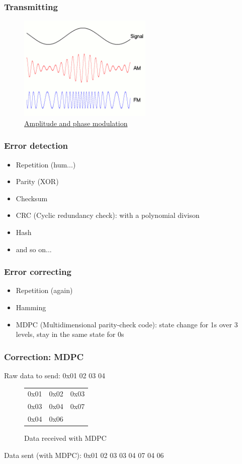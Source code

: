   \begin{frame}
    \frametitle{Transmitting}
    \begin{figure}[t]
      \centering
      \includegraphics[height=5cm]{./imgs/modulation.png}
      \caption{\color{blue}\href{https://upload.wikimedia.org/wikipedia/commons/a/a4/Amfm3-en-de.gif}{Amplitude and phase modulation}}
      \label{fig:modulation}
    \end{figure}
  \end{frame}
  \begin{frame}
    \frametitle{Error detection}
      \begin{itemize}
        \item Repetition (hum...) \pause
        \item Parity (XOR) \pause
        \item Checksum \pause
        \item CRC (Cyclic redundancy check): with a polynomial divison \pause
        \item Hash \pause
        \item and so on...
      \end{itemize}
  \end{frame}
  \begin{frame}
    \frametitle{Error correcting}
      \begin{itemize}
        \item Repetition (again) \pause
        \item Hamming \pause
        \item MDPC (Multidimensional parity-check code): state change for 1s over 3 levels, stay in the same state for 0s \pause
      \end{itemize}
  \end{frame}

  \begin{frame}
    \frametitle{Correction: MDPC}
    Raw data to send: 0x01 02 03 04
      \begin{figure}[h]
      \centering
      \begin{tabular}{cc|c}
        0x01 & 0x02 & 0x03 \\
        0x03 & 0x04 & 0x07 \\ \hline
        0x04 & 0x06 &
      \end{tabular}
      \caption{Data received with MDPC}
      \label{fig:ami}
    \end{figure}
  Data sent (with MDPC): 0x01 02 03 03 04 07 04 06
  \end{frame}

